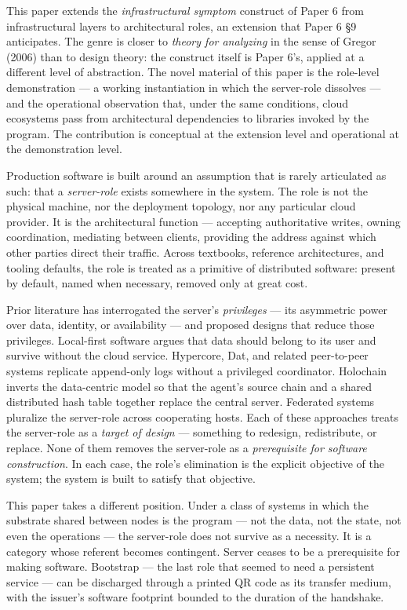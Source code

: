 \documentclass[
]{article}
\begin{document}
This paper extends the \emph{infrastructural symptom} construct of Paper
6 from infrastructural layers to architectural roles, an extension that
Paper 6 §9 anticipates. The genre is closer to \emph{theory for
analyzing} in the sense of Gregor (2006) than to design theory: the
construct itself is Paper 6's, applied at a different level of
abstraction. The novel material of this paper is the role-level
demonstration --- a working instantiation in which the server-role
dissolves --- and the operational observation that, under the same
conditions, cloud ecosystems pass from architectural dependencies to
libraries invoked by the program. The contribution is conceptual at the
extension level and operational at the demonstration level.

Production software is built around an assumption that is rarely
articulated as such: that a \emph{server-role} exists somewhere in the
system. The role is not the physical machine, nor the deployment
topology, nor any particular cloud provider. It is the architectural
function --- accepting authoritative writes, owning coordination,
mediating between clients, providing the address against which other
parties direct their traffic. Across textbooks, reference architectures,
and tooling defaults, the role is treated as a primitive of distributed
software: present by default, named when necessary, removed only at
great cost.

Prior literature has interrogated the server's \emph{privileges} --- its
asymmetric power over data, identity, or availability --- and proposed
designs that reduce those privileges. Local-first software argues that
data should belong to its user and survive without the cloud service.
Hypercore, Dat, and related peer-to-peer systems replicate append-only
logs without a privileged coordinator. Holochain inverts the
data-centric model so that the agent's source chain and a shared
distributed hash table together replace the central server. Federated
systems pluralize the server-role across cooperating hosts. Each of
these approaches treats the server-role as a \emph{target of design} ---
something to redesign, redistribute, or replace. None of them removes
the server-role as a \emph{prerequisite for software construction}. In
each case, the role's elimination is the explicit objective of the
system; the system is built to satisfy that objective.

This paper takes a different position. Under a class of systems in which
the substrate shared between nodes is the program --- not the data, not
the state, not even the operations --- the server-role does not survive
as a necessity. It is a category whose referent becomes contingent.
Server ceases to be a prerequisite for making software. Bootstrap ---
the last role that seemed to need a persistent service --- can be
discharged through a printed QR code as its transfer medium, with the
issuer's software footprint bounded to the duration of the handshake.
\end{document}
